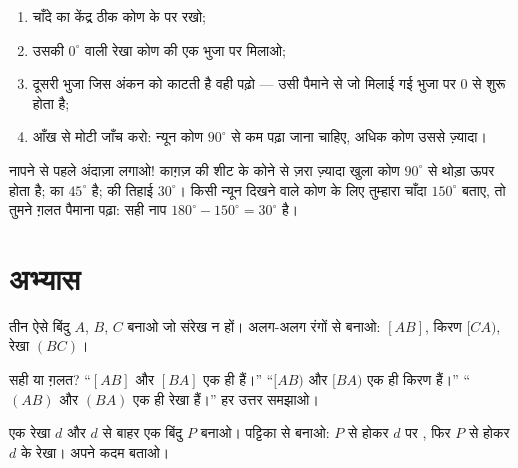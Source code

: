 \begin{method}[चाँदे से कोण नापना]\label{met:g6:lines:protractor}
\begin{enumerate}
  \item चाँदे का केंद्र ठीक कोण के  पर रखो;
  \item उसकी $0^\circ$ वाली रेखा कोण की एक भुजा पर मिलाओ;
  \item दूसरी भुजा जिस अंकन को काटती है वही पढ़ो --- उसी पैमाने
        से जो मिलाई गई भुजा पर $0$ से शुरू होता है;
  \item आँख से मोटी जाँच करो: न्यून कोण $90^\circ$ से कम पढ़ा
        जाना चाहिए, अधिक कोण उससे ज़्यादा।
\end{enumerate}
\end{method}

\begin{example}\label{ex:g6:lines:estimate}
नापने से पहले अंदाज़ा लगाओ! काग़ज़ की शीट के कोने से ज़रा ज़्यादा
खुला कोण $90^\circ$ से थोड़ा ऊपर होता है;  का 
$45^\circ$ है;  की तिहाई $30^\circ$। किसी न्यून दिखने वाले
कोण के लिए तुम्हारा चाँदा $150^\circ$ बताए, तो तुमने ग़लत पैमाना
पढ़ा: सही नाप $180^\circ - 150^\circ = 30^\circ$ है।
\end{example}

\section{अभ्यास}

\begin{exercise}[$\star$]\label{exo:g6:lines:1}
तीन ऐसे बिंदु $A$, $B$, $C$ बनाओ जो संरेख न हों। अलग-अलग रंगों
से बनाओ:  $[AB]$, किरण $[CA)$, रेखा $(BC)$।
\end{exercise}

\begin{exercise}[$\star$]\label{exo:g6:lines:2}
सही या ग़लत? ``$[AB]$ और $[BA]$ एक ही  हैं।''
``$[AB)$ और $[BA)$ एक ही किरण हैं।'' ``$(AB)$ और $(BA)$ एक ही
रेखा हैं।'' हर उत्तर समझाओ।
\end{exercise}

\begin{exercise}[$\star$]\label{exo:g6:lines:3}
एक रेखा $d$ और $d$ से बाहर एक बिंदु $P$ बनाओ।  पट्टिका से
बनाओ: $P$ से होकर $d$ पर , फिर $P$ से होकर $d$ के 
रेखा। अपने कदम बताओ।
\end{exercise}

